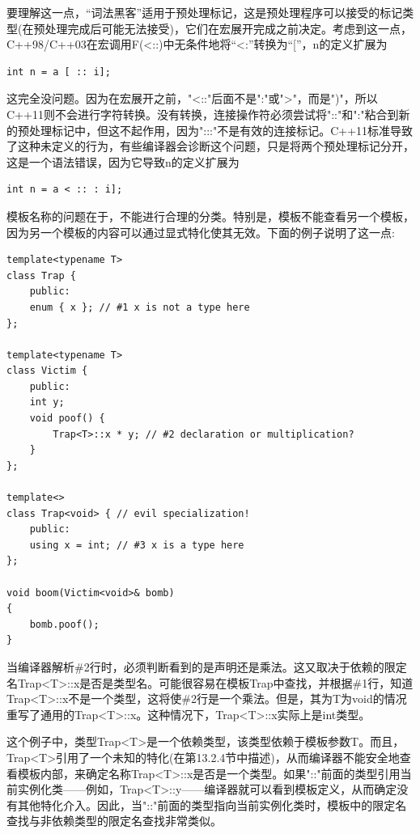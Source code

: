 要理解这一点，“词法黑客”适用于预处理标记，这是预处理程序可以接受的标记类型(在预处理完成后可能无法接受)，它们在宏展开完成之前决定。考虑到这一点，C++98/C++03在宏调用F(<::)中无条件地将“<:”转换为“[”，n的定义扩展为

\begin{lstlisting}[style=styleCXX]
int n = a [ :: i];
\end{lstlisting}

这完全没问题。因为在宏展开之前，"<::"后面不是":"或">"，而是")"，所以C++11则不会进行字符转换。没有转换，连接操作符必须尝试将"::"和":"粘合到新的预处理标记中，但这不起作用，因为":::"不是有效的连接标记。C++11标准导致了这种未定义的行为，有些编译器会诊断这个问题，只是将两个预处理标记分开，这是一个语法错误，因为它导致n的定义扩展为

\begin{lstlisting}[style=styleCXX]
int n = a < :: : i];
\end{lstlisting}


模板名称的问题在于，不能进行合理的分类。特别是，模板不能查看另一个模板，因为另一个模板的内容可以通过显式特化使其无效。下面的例子说明了这一点:

\begin{lstlisting}[style=styleCXX]
template<typename T>
class Trap {
	public:
	enum { x }; // #1 x is not a type here
};

template<typename T>
class Victim {
	public:
	int y;
	void poof() {
		Trap<T>::x * y; // #2 declaration or multiplication?
	}
};

template<>
class Trap<void> { // evil specialization!
	public:
	using x = int; // #3 x is a type here
};

void boom(Victim<void>& bomb)
{
	bomb.poof();
}
\end{lstlisting}

当编译器解析\#2行时，必须判断看到的是声明还是乘法。这又取决于依赖的限定名Trap<T>::x是否是类型名。可能很容易在模板Trap中查找，并根据\#1行，知道Trap<T>::x不是一个类型，这将使\#2行是一个乘法。但是，其为T为void的情况重写了通用的Trap<T>::x。这种情况下，Trap<T>::x实际上是int类型。

这个例子中，类型Trap<T>是一个依赖类型，该类型依赖于模板参数T。而且，Trap<T>引用了一个未知的特化(在第13.2.4节中描述)，从而编译器不能安全地查看模板内部，来确定名称Trap<T>::x是否是一个类型。如果"::"前面的类型引用当前实例化类——例如，Trap<T>::y——编译器就可以看到模板定义，从而确定没有其他特化介入。因此，当"::"前面的类型指向当前实例化类时，模板中的限定名查找与非依赖类型的限定名查找非常类似。

